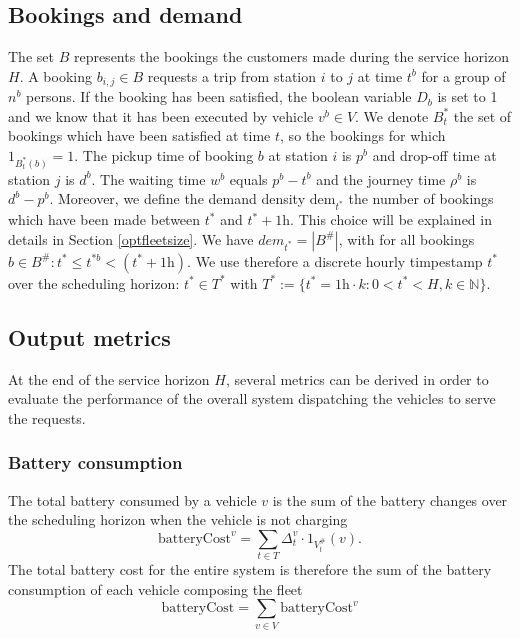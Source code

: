 \documentclass[12pt,a4paper]{article}
\begin{document}
\subsection{Bookings and demand}\label{bookings}
The set $B$ represents the bookings the customers made during the service horizon $H$. A booking $b_{i,j} \in B$ requests a trip from station $i$ to $j$ at time $t^{b}$ for a group of $n^{b}$ persons. If the booking has been satisfied, the boolean variable $D_{b}$ is set to 1 and we know that it has been executed by vehicle $v^{b} \in V$. We denote $B^{*}_{t}$ the set of bookings which have been satisfied at time $t$, so the bookings for which $1_{B^{*}_{t}(b)} = 1$.  The pickup time of booking $b$ at station $i$ is $p^{b}$ and drop-off time at station $j$ is $d^{b}$. The waiting time $w^{b}$ equals $p^{b} - t^{b}$ and the journey time $\rho^{b}$ is $d^{b} - p^{b}$. Moreover, we define the demand density $\text{dem}_{t^{*}}$ the number of bookings which have been made between $t^{*}$ and $t^{*} + 1\text{h}$. This choice will be explained in details in Section \ref{optfleetsize}. We have $dem_{t^{*}} = |B^{\#}|$, with for all bookings $b \in B^{\#}: t^{*} \leq t^{*b} < (t^{*}+1\text{h})$. We use therefore a discrete hourly timpestamp $t^{*}$ over the scheduling horizon: $t^{*} \in T^{*}$ with $T^{*} := \{t^{*} = 1\text{h} \cdot k: 0 < t^{*} < H, k \in \mathbb{N}\}$.

\subsection{Output metrics}\label{metrics}
At the end of the service horizon $H$, several metrics can be derived in order to evaluate the performance of the overall system dispatching the vehicles to serve the requests. 

\subsubsection{Battery consumption}
The total battery consumed by a vehicle $v$ is the sum of the battery changes over the scheduling horizon when the vehicle is not charging
$$\text{batteryCost}^{v} = \sum_{t \in T}\Delta^{v}_{t} \cdot 1_{V^{\#}_{t}}(v) .$$
The total battery cost for the entire system is therefore the sum of the battery consumption of each vehicle composing the fleet
$$\text{batteryCost} = \sum_{v \in V}\text{batteryCost}^{v}$$
\end{document}
